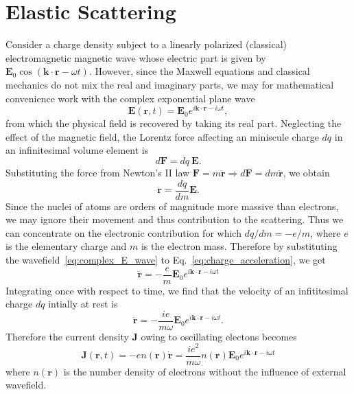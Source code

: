 \section{Elastic Scattering}

Consider a charge density subject to a linearly polarized (classical) electromagnetic magnetic wave whose electric part is given by $\mathbf{E}_0 \cos (\mathbf{k}\cdot\mathbf{r}- \omega t)$. However, since the Maxwell equations and classical mechanics do not mix the real and imaginary parts, we may for mathematical convenience work with the complex exponential plane wave 
\begin{equation}\label{eq:complex_E_wave}
\mathbf{E}(\mathbf{r},t) = \mathbf{E}_0 e^{i \mathbf{k}\cdot\mathbf{r}-i \omega t},
\end{equation}
from which the physical field is recovered by taking its real part. Neglecting the effect of the magnetic field, the Lorentz force affecting an miniscule charge $dq$ in an infinitesimal volume element is
\begin{equation}
d\mathbf{F} = dq \ \mathbf{E}.
\end{equation}
Substituting the force from Newton's II law $\mathbf{F} = m \ddot{\mathbf{r}} \Rightarrow d\mathbf{F} = dm \ddot{\mathbf{r}}$, we obtain
\begin{equation}\label{eq:charge_acceleration}
\ddot{\mathbf{r}} = \frac{dq}{dm} \mathbf{E}.
\end{equation}
Since the nuclei of atoms are orders of magnitude more massive than electrons, we may ignore their movement and thus contribution to the scattering. Thus we can concentrate on the electronic contribution for which $dq/dm = -e/m$, where $e$ is the elementary charge and $m$ is the electron mass. Therefore by substituting the wavefield~\eqref{eq:complex_E_wave} to Eq.~\eqref{eq:charge_acceleration}, we get
\begin{equation}
\ddot{\mathbf{r}} = -\frac{e}{m} \mathbf{E}_0 e^{i \mathbf{k}\cdot\mathbf{r}-i \omega t}
\end{equation}
Integrating once with respect to time, we find that the velocity of an infititesimal charge $dq$ intially at rest is
\begin{equation}
\dot{\mathbf{r}} = -\frac{ie}{m\omega} \mathbf{E}_0 e^{i \mathbf{k}\cdot\mathbf{r}-i \omega t}.
\end{equation}
Therefore the current density $\mathbf{J}$ owing to oscillating electons becomes
\begin{equation}\label{eq:oscillating_J}
\mathbf{J}(\mathbf{r},t) = -en(\mathbf{r})\dot{\mathbf{r}} =
\frac{ie^2}{m\omega} n(\mathbf{r}) \mathbf{E}_0 e^{i \mathbf{k}\cdot\mathbf{r}-i \omega t}
\end{equation}
where $n(\mathbf{r})$ is the number density of electrons without the influence of external wavefield.

